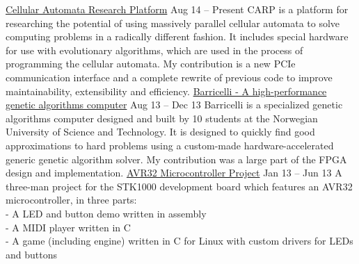\documentclass[print]{friggeri-cv}
\begin{document}
\begin{entrylist}
    \entryy
        {\href{https://github.com/lundal/carp}{Cellular Automata Research Platform}}
        {Aug 14 – Present}
        {CARP is a platform for researching the potential of using massively parallel cellular automata to solve computing problems in a radically different fashion.
         It includes special hardware for use with evolutionary algorithms, which are used in the process of programming the cellular automata.
         My contribution is a new PCIe communication interface and a complete rewrite of previous code to improve maintainability, extensibility and efficiency.}
    \entryspace
    \entryy
        {\href{http://lund.al/barricel.li/}{Barricelli - A high-performance genetic algorithms computer}}
        {Aug 13 – Dec 13}
        {Barricelli is a specialized genetic algorithms computer designed and built by 10 students at the Norwegian University of Science and Technology.
         It is designed to quickly find good approximations to hard problems using a custom-made hardware-accelerated generic genetic algorithm solver.
         My contribution was a large part of the FPGA design and implementation.}
    \entryspace
    \entryy
        {\href{https://github.com/lundal/avr32-project-2013}{AVR32 Microcontroller Project}}
        {Jan 13 – Jun 13}
        {A three-man project for the STK1000 development board which features an AVR32 microcontroller, in three parts:\\
        - A LED and button demo written in assembly\\
        - A MIDI player written in C\\
        - A game (including engine) written in C for Linux with custom drivers for LEDs and buttons}
\end{entrylist}
\end{document}
